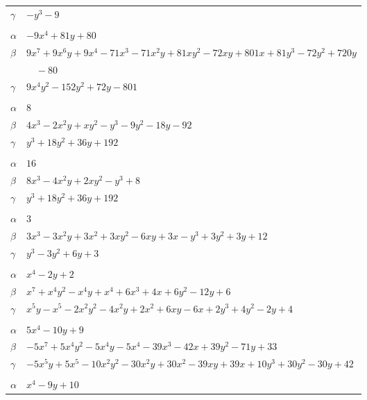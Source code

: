 \documentclass[11pt]{article}
\begin{document}
\begin{longtable}{@{}ll@{}}
$\gamma$ & $-y^{3}-9$\\
\addlinespace[3pt]
\multicolumn{2}{@{}l}{$\{i,j\}=\{4,40\}$, $k_{ij}=2^{4}\cdot 5$}\\
$\alpha$ & $-9x^{4}+81y+80$\\
$\beta$ & $9x^{7}+9x^{6}y+9x^{4}-71x^{3}-71x^{2}y+81xy^{2}-72xy+801x+81y^{3}-72y^{2}+720y$\\
 & $\quad -80$\\
$\gamma$ & $9x^{4}y^{2}-152y^{2}+72y-801$\\
\addlinespace[3pt]
\multicolumn{2}{@{}l}{$\{i,j\}=\{5,6\}$, $k_{ij}=2^{3}\cdot 5^{2}$}\\
$\alpha$ & $8$\\
$\beta$ & $4x^{3}-2x^{2}y+xy^{2}-y^{3}-9y^{2}-18y-92$\\
$\gamma$ & $y^{3}+18y^{2}+36y+192$\\
\addlinespace[3pt]
\multicolumn{2}{@{}l}{$\{i,j\}=\{5,33\}$, $k_{ij}=2^{4}\cdot 5^{2}$}\\
$\alpha$ & $16$\\
$\beta$ & $8x^{3}-4x^{2}y+2xy^{2}-y^{3}+8$\\
$\gamma$ & $y^{3}+18y^{2}+36y+192$\\
\addlinespace[3pt]
\multicolumn{2}{@{}l}{$\{i,j\}=\{6,38\}$, $k_{ij}=3^{2}$}\\
$\alpha$ & $3$\\
$\beta$ & $3x^{3}-3x^{2}y+3x^{2}+3xy^{2}-6xy+3x-y^{3}+3y^{2}+3y+12$\\
$\gamma$ & $y^{3}-3y^{2}+6y+3$\\
\addlinespace[3pt]
\multicolumn{2}{@{}l}{$\{i,j\}=\{6,40\}$, $k_{ij}=2^{3}$}\\
$\alpha$ & $x^{4}-2y+2$\\
$\beta$ & $x^{7}+x^{4}y^{2}-x^{4}y+x^{4}+6x^{3}+4x+6y^{2}-12y+6$\\
$\gamma$ & $x^{5}y-x^{5}-2x^{2}y^{2}-4x^{2}y+2x^{2}+6xy-6x+2y^{3}+4y^{2}-2y+4$\\
\addlinespace[3pt]
\multicolumn{2}{@{}l}{$\{i,j\}=\{7,40\}$, $k_{ij}=2\cdot 3\cdot 7$}\\
$\alpha$ & $5x^{4}-10y+9$\\
$\beta$ & $-5x^{7}+5x^{4}y^{2}-5x^{4}y-5x^{4}-39x^{3}-42x+39y^{2}-71y+33$\\
$\gamma$ & $-5x^{5}y+5x^{5}-10x^{2}y^{2}-30x^{2}y+30x^{2}-39xy+39x+10y^{3}+30y^{2}-30y+42$\\
\addlinespace[3pt]
\multicolumn{2}{@{}l}{$\{i,j\}=\{7,44\}$, $k_{ij}=7^{3}$}\\
$\alpha$ & $x^{4}-9y+10$\\

\end{longtable}
\end{document}
